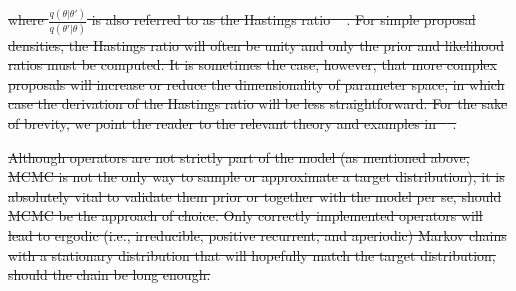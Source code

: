 \documentclass[oneside]{article}
\providecommand{\DIFdeltex}[1]{{\protect\color{red}\sout{#1}}}                      %
\providecommand{\DIFdelbegin}{} %
\providecommand{\DIFdelend}{} %
\providecommand{\DIFdel}[1]{\texorpdfstring{\DIFdeltex{#1}}{}} %
\newcommand{\DIFscaledelfig}{0.5}
\newlength{\DIFdelgraphicswidth} %
\newlength{\DIFdelgraphicsheight} %
\newcommand{\DIFdelincludegraphics}[2][]{%
\sbox{\DIFdelgraphicsbox}{\DIFOincludegraphics[#1]{#2}}%
\settoboxwidth{\DIFdelgraphicswidth}{\DIFdelgraphicsbox} %
\settoboxtotalheight{\DIFdelgraphicsheight}{\DIFdelgraphicsbox} %
\scalebox{\DIFscaledelfig}{%
\parbox[b]{\DIFdelgraphicswidth}{\usebox{\DIFdelgraphicsbox}\\[-\baselineskip] \rule{\DIFdelgraphicswidth}{0em}}\llap{\resizebox{\DIFdelgraphicswidth}{\DIFdelgraphicsheight}{%
\setlength{\unitlength}{\DIFdelgraphicswidth}%
\begin{picture}(1,1)%
\thicklines\linethickness{2pt} %
{\color[rgb]{1,0,0}\put(0,0){\framebox(1,1){}}}%
{\color[rgb]{1,0,0}\put(0,0){\line( 1,1){1}}}%
{\color[rgb]{1,0,0}\put(0,1){\line(1,-1){1}}}%
\end{picture}%
}\hspace*{3pt}}} %
} %
\DeclareRobustCommand{\DIFdelbegin}{\DIFOdelbegin \let\includegraphics\DIFdelincludegraphics} %
\DeclareRobustCommand{\DIFdelend}{\DIFOaddend \let\includegraphics\DIFOincludegraphics} %
\begin{document}
\DIFdelbegin %
\DIFdel{where $\frac{q(\theta|\theta')}{q(\theta'|\theta)}$ is also
referred to as the Hastings ratio \mbox{%
\citep{smith93,tierney94,gelman}}\hspace{0pt}%
.
For simple proposal densities, the Hastings ratio will often be unity and
only the prior and likelihood ratios must be computed.
It is sometimes the case, however, that more complex proposals will
increase or reduce the dimensionality of parameter space, in which
case the derivation of the Hastings ratio will be less straightforward.
For the sake of brevity, we point the reader to the relevant theory
and examples in \mbox{%
\citep{green95,huelsenbeck04,drummond10}}\hspace{0pt}%
.
}\DIFdelend %

\DIFdelbegin \DIFdel{Although operators are not strictly part of the model (as mentioned
above, MCMC is not the only way to sample or approximate a target
distribution), it is absolutely vital to validate them prior or
together with the model per se, should MCMC be the approach of choice.
Only correctly implemented operators will lead to ergodic (i.e.,
irreducible, positive recurrent, and aperiodic) Markov
chains with a stationary distribution that will hopefully match
the target distribution, should the chain be long enough.
}\DIFdelend %
\end{document}
